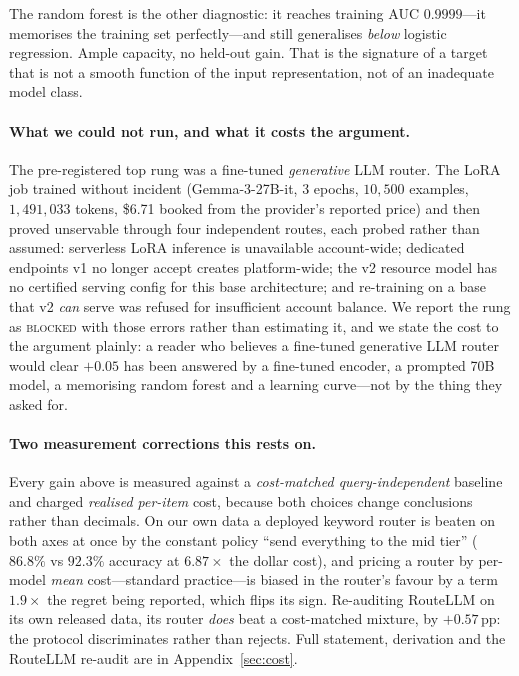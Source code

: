 \documentclass[10pt]{article}
\newcommand{\pp}{\,\text{pp}}
\newcommand{\FTTRAIN}{6.71}
\begin{document}
The random forest is the other diagnostic: it reaches training AUC
$0.9999$---it memorises the training set perfectly---and still generalises
\emph{below} logistic regression. Ample capacity, no held-out gain. That is the
signature of a target that is not a smooth function of the input representation,
not of an inadequate model class.

\paragraph{What we could not run, and what it costs the argument.} The
pre-registered top rung was a fine-tuned \emph{generative} LLM router. The LoRA
job trained without incident (Gemma-3-27B-it, 3 epochs, $10{,}500$ examples,
$1{,}491{,}033$ tokens, \$\FTTRAIN{} booked from the provider's reported price)
and then proved unservable through four independent routes, each probed rather
than assumed: serverless LoRA inference is unavailable account-wide; dedicated
endpoints v1 no longer accept creates platform-wide; the v2 resource model has
no certified serving config for this base architecture; and re-training on a
base that v2 \emph{can} serve was refused for insufficient account balance. We
report the rung as \textsc{blocked} with those errors rather than estimating it,
and we state the cost to the argument plainly: a reader who believes a fine-tuned
generative LLM router would clear $+0.05$ has been answered by a fine-tuned
encoder, a prompted 70B model, a memorising random forest and a learning
curve---not by the thing they asked for.

\paragraph{Two measurement corrections this rests on.} Every gain above is
measured against a \emph{cost-matched query-independent} baseline and charged
\emph{realised per-item} cost, because both choices change conclusions rather
than decimals. On our own data a deployed keyword router is beaten on both axes
at once by the constant policy ``send everything to the mid tier'' ($86.8\%$ vs
$92.3\%$ accuracy at $6.87\times$ the dollar cost), and pricing a router by
per-model \emph{mean} cost---standard practice---is biased in the router's
favour by a term $1.9\times$ the regret being reported, which flips its sign.
Re-auditing RouteLLM \citep{ong2024routellm} on its own released data, its
router \emph{does} beat a cost-matched mixture, by $+0.57\pp$: the protocol
discriminates rather than rejects. Full statement, derivation and the RouteLLM
re-audit are in Appendix~\ref{sec:cost}.
\end{document}
